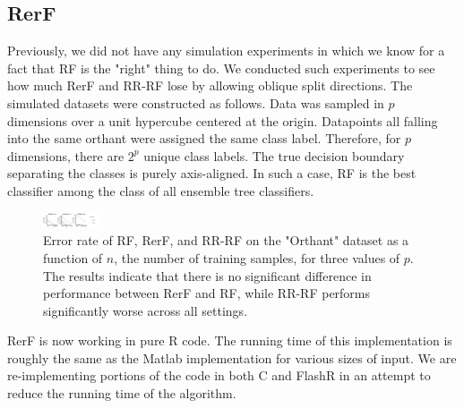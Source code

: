 \documentclass[simplex.tex]{subfiles}
\begin{document}
\subsection{RerF}


Previously, we did not have any simulation experiments in which we know for a fact that RF is the "right" thing to do. We conducted such experiments to see how much RerF and RR-RF lose by allowing oblique split directions. The simulated datasets were constructed as follows. Data was sampled in $p$ dimensions over a unit hypercube centered at the origin. Datapoints all falling into the same orthant were assigned the same class label. Therefore, for $p$ dimensions, there are $2^p$ unique class labels. The true decision boundary separating the classes is purely axis-aligned. In such a case, RF is the best classifier among the class of all ensemble tree classifiers.

\begin{figure}[!h]
\begin{cframed}
\centering
\includegraphics[width=0.15\textwidth]{../../figs/RerF.pdf}
\caption{Error rate of RF, RerF, and RR-RF on the "Orthant" dataset as a function of $n$, the number of training samples, for three values of $p$. The results indicate that there is no significant difference in performance between RerF and RF, while RR-RF performs significantly worse across all settings.}
\label{fig:name}
\end{cframed}
\end{figure}
\clearpage

RerF is now working in pure R code.  The running time of this implementation is roughly the same as the Matlab implementation for various sizes of input.  We are re-implementing portions of the code in both C and FlashR in an attempt to reduce the running time of the algorithm.
\end{document}
